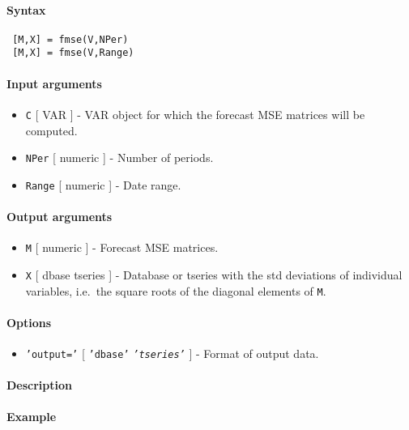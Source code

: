 


	\paragraph{Syntax}
 
 \begin{verbatim}
 [M,X] = fmse(V,NPer)
 [M,X] = fmse(V,Range)
 \end{verbatim}
 
 \paragraph{Input arguments}
 
 \begin{itemize}
 \item
   \texttt{C} {[} VAR {]} - VAR object for which the forecast MSE
   matrices will be computed.
 \item
   \texttt{NPer} {[} numeric {]} - Number of periods.
 \item
   \texttt{Range} {[} numeric {]} - Date range.
 \end{itemize}
 
 \paragraph{Output arguments}
 
 \begin{itemize}
 \item
   \texttt{M} {[} numeric {]} - Forecast MSE matrices.
 \item
   \texttt{X} {[} dbase \textbar{} tseries {]} - Database or tseries with
   the std deviations of individual variables, i.e.~the square roots of
   the diagonal elements of \texttt{M}.
 \end{itemize}
 
 \paragraph{Options}
 
 \begin{itemize}
 \item
   \texttt{'output='} {[} \texttt{'dbase'} \textbar{}
   \emph{\texttt{'tseries'}} {]} - Format of output data.
 \end{itemize}
 
 \paragraph{Description}
 
 \paragraph{Example}


